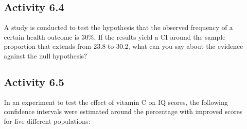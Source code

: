 \documentclass[
]{memoir}
\begin{document}
\hypertarget{activity-6.4}{%
\subsection*{Activity 6.4}\label{activity-6.4}}

A study is conducted to test the hypothesis that the observed frequency of a certain health outcome is 30\%. If the results yield a CI around the sample proportion that extends from 23.8 to 30.2, what can you say about the evidence against the null hypothesis?

\hypertarget{activity-6.5}{%
\subsection*{Activity 6.5}\label{activity-6.5}}

In an experiment to test the effect of vitamin C on IQ scores, the following confidence intervals were estimated around the percentage with improved scores for five different populations:

 
  \providecommand{\huxb}[2]{\arrayrulecolor[RGB]{#1}\global\arrayrulewidth=#2pt}
  \providecommand{\huxvb}[2]{\color[RGB]{#1}\vrule width #2pt}
  \providecommand{\huxtpad}[1]{\rule{0pt}{#1}}
  \providecommand{\huxbpad}[1]{\rule[-#1]{0pt}{#1}}
\end{document}
